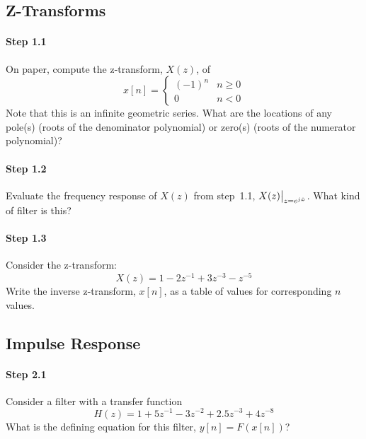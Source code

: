 \subsection{Z-Transforms}

\paragraph{Step 1.1} On paper, compute the z-transform, $X(z)$, of
	\begin{equation}
		x[n] = \left\{
		\begin{array}{ll}
			(-1)^n & n \ge 0 \\
			0 & n < 0
		\end{array}\right.
	\end{equation}
	Note that this is an infinite geometric series. 
	What are the locations of any pole(s) (roots of the denominator
	polynomial) or zero(s) (roots of the numerator polynomial)?


\paragraph{Step 1.2} Evaluate the frequency response of $X(z)$ from
	step~1.1, $X(z)\big{|}_{z=e^{j\hat{\omega}}}$. 
	What kind of filter is this?


\paragraph{Step 1.3} Consider the z-transform:
	\begin{equation}
	  X(z) = 1 - 2z^{-1} + 3z^{-3} - z^{-5}  
	\end{equation}
	Write the inverse z-transform, $x[n]$, as a table of values for
	corresponding $n$ values.


\subsection{Impulse Response}

\paragraph{Step 2.1} Consider a filter with a transfer function
	\begin{equation}
	H(z) = 1 + 5z^{-1} - 3z^{-2} + 2.5z^{-3} + 4z^{-8}  
	\end{equation}
	What is the defining equation for this filter, $y[n] = F(x[n])$?


